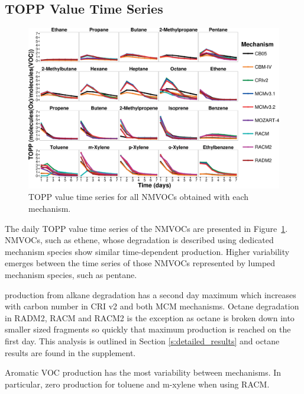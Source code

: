 \subsection{TOPP Value Time Series} \label{ss:profiles} %

\begin{figure}
    \centering
    \includegraphics[width=\textwidth]{img/TOPP_daily_values_all_species}
    \vspace{0mm}
    \caption{TOPP value time series for all NMVOCs obtained with each mechanism.}
    \vspace{-4mm}
    \label{f:TOPP_dailies}
\end{figure}

The daily TOPP value time series of the NMVOCs are presented in \mbox{Figure \ref{f:TOPP_dailies}}. 
NMVOCs, such as ethene, whose degradation is described using dedicated mechanism species show similar time-dependent  production.
Higher variability emerges between the time series of those NMVOCs represented by lumped mechanism species, such as pentane.

 production from alkane degradation has a second day maximum which increases with carbon number in CRI v2 and both MCM mechanisms.
Octane degradation in RADM2, RACM and RACM2 is the exception as octane is broken down into smaller sized fragments so quickly that maximum  production is reached on the first day.
This analysis is outlined in Section \ref{s:detailed_results} and octane results are found in the supplement.

Aromatic VOC  production has the most variability between mechanisms. 
In particular, zero  production for toluene and m-xylene when using RACM.

